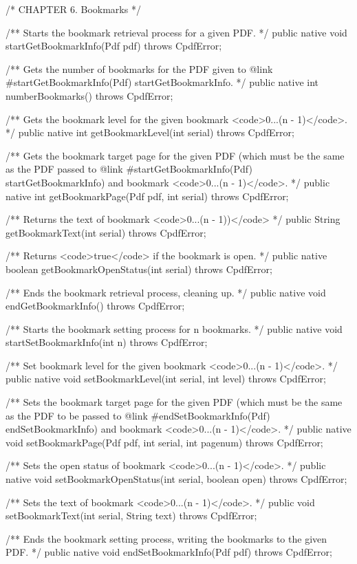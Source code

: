 /* CHAPTER 6. Bookmarks */

/** Starts the bookmark retrieval process for a given PDF. */
public native void startGetBookmarkInfo(Pdf pdf) throws CpdfError;

/** Gets the number of bookmarks for the PDF given to {@link
#startGetBookmarkInfo(Pdf) startGetBookmarkInfo}. */
public native int numberBookmarks() throws CpdfError;

/** Gets the bookmark level for the given bookmark
<code>0...(n - 1)</code>. */
public native int getBookmarkLevel(int serial) throws CpdfError;

/** Gets the bookmark target page for the given PDF (which must be the
same as the PDF passed to  {@link #startGetBookmarkInfo(Pdf)
startGetBookmarkInfo}) and bookmark <code>0...(n - 1)</code>. */
public native int getBookmarkPage(Pdf pdf, int serial) throws CpdfError;

/** Returns the text of bookmark <code>0...(n - 1))</code> */
public String getBookmarkText(int serial) throws CpdfError;

/** Returns <code>true</code> if the bookmark is open. */
public native boolean getBookmarkOpenStatus(int serial) throws CpdfError;

/** Ends the bookmark retrieval process, cleaning up. */
public native void endGetBookmarkInfo() throws CpdfError;

/** Starts the bookmark setting process for n bookmarks. */
public native void startSetBookmarkInfo(int n) throws CpdfError;

/** Set bookmark level for the given bookmark <code>0...(n - 1)</code>. */
public native void setBookmarkLevel(int serial, int level)
    throws CpdfError;

/** Sets the bookmark target page for the given PDF (which must be the same
as the PDF to be passed to {@link #endSetBookmarkInfo(Pdf)
endSetBookmarkInfo}) and bookmark <code>0...(n - 1)</code>. */
public native void setBookmarkPage(Pdf pdf, int serial, int pagenum)
    throws CpdfError;

/** Sets the open status of bookmark <code>0...(n - 1)</code>. */
public native void setBookmarkOpenStatus(int serial, boolean open)
    throws CpdfError;

/** Sets the text of bookmark <code>0...(n - 1)</code>. */
public void setBookmarkText(int serial, String text) throws CpdfError;

/** Ends the bookmark setting process, writing the bookmarks to the given
PDF. */
public native void endSetBookmarkInfo(Pdf pdf) throws CpdfError;

